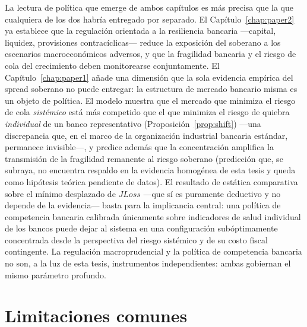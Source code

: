 La lectura de política que emerge de ambos capítulos es más precisa que la que cualquiera de los dos habría entregado por separado. El Capítulo~\ref{chap:paper2} ya establece que la regulación orientada a la resiliencia bancaria —capital, liquidez, provisiones contracíclicas— reduce la exposición del soberano a los escenarios macroeconómicos adversos, y que la fragilidad bancaria y el riesgo de cola del crecimiento deben monitorearse conjuntamente. El Capítulo~\ref{chap:paper1} añade una dimensión que la sola evidencia empírica del spread soberano no puede entregar: la estructura de mercado bancario misma es un objeto de política. El modelo muestra que el mercado que minimiza el riesgo de cola \textit{sistémico} está más competido que el que minimiza el riesgo de quiebra \textit{individual} de un banco representativo (Proposición~\ref{prop:shift}) —una discrepancia que, en el marco de la organización industrial bancaria estándar, permanece invisible—, y predice además que la concentración amplifica la transmisión de la fragilidad remanente al riesgo soberano (predicción que, se subraya, no encuentra respaldo en la evidencia homogénea de esta tesis y queda como hipótesis teórica pendiente de datos). El resultado de estática comparativa sobre el mínimo desplazado de $JLoss$ —que sí es puramente deductivo y no depende de la evidencia— basta para la implicancia central: una política de competencia bancaria calibrada únicamente sobre indicadores de salud individual de los bancos puede dejar al sistema en una configuración subóptimamente concentrada desde la perspectiva del riesgo sistémico y de su costo fiscal contingente. La regulación macroprudencial y la política de competencia bancaria no son, a la luz de esta tesis, instrumentos independientes: ambas gobiernan el mismo parámetro profundo.

\section{Limitaciones comunes}

